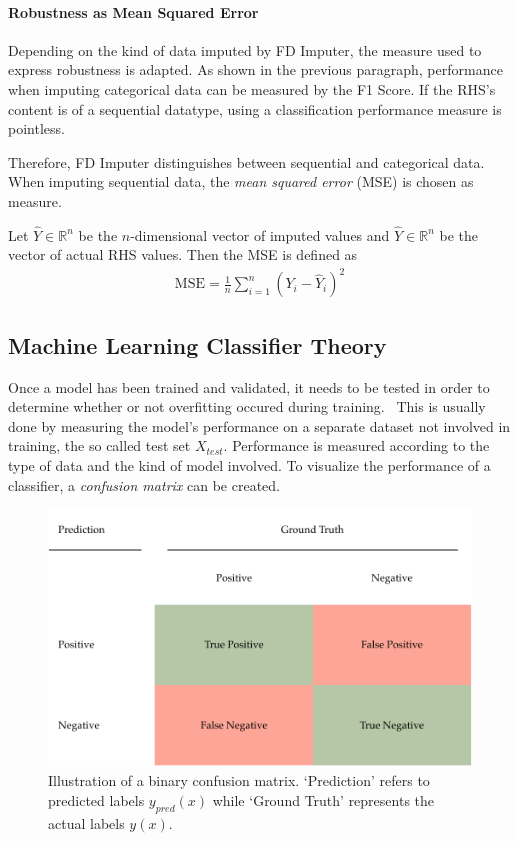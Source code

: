 \paragraph{Robustness as Mean Squared Error}
Depending on the kind of data imputed by FD Imputer, the measure used to express robustness is adapted.
As shown in the previous paragraph, performance when imputing categorical data can be measured by the F1 Score.
If the RHS's content is of a sequential datatype, using a classification performance measure is pointless.

Therefore, FD Imputer distinguishes between sequential and categorical data.
When imputing sequential data, the \emph{mean squared error} (MSE) is chosen as measure.

Let \( \hat{Y} \in \mathbb{R}^{n}\) be the \( n \)-dimensional vector of imputed values and \( \hat{Y} \in \mathbb{R}^{n} \) be the vector of actual RHS values.
Then the MSE is defined as~\cite[p.~597]{MOO11}
\begin{align}\label{eq:fd-imputer-mse}
\text{MSE} = \frac{1}{n}\sum_{i=1}^{n} \left(Y_i - \hat{Y}_i\right)^2
\end{align}

\newpage

\subsection{Machine Learning Classifier Theory}
Once a model has been trained and validated, it needs to be tested in order to determine whether or not overfitting occured during training.~\cite[p.~32]{BIS06}
This is usually done by measuring the model's performance on a separate dataset not involved in training, the so called test set \( X_{test} \).
Performance is measured according to the type of data and the kind of model involved.
To visualize the performance of a classifier, a \emph{confusion matrix} can be created.~\cite[p.~2]{THA18}
\begin{figure}[ht]
     \centering
     \includegraphics[width=\textwidth]{images/binary-confusion-matrix.pdf}
     \caption{Illustration of a binary confusion matrix.
     `Prediction' refers to predicted labels \(y_{pred}(x)\) while `Ground Truth' represents the actual labels \(y(x)\).}
     \label{fig:confusion-matrix}
 \end{figure}

